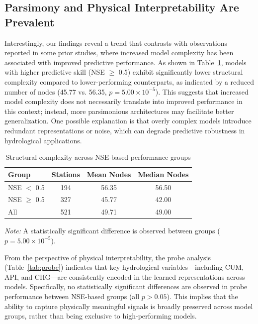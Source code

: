 \subsection{Parsimony and Physical Interpretability Are Prevalent}
Interestingly, our findings reveal a trend that contrasts with observations reported in some prior studies\cite{DONG2024130941,ZHOU2024132235}, where increased model complexity has been associated with improved predictive performance. As shown in Table~\ref{tab:complexity}, models with higher predictive skill (NSE $\geq$ 0.5) exhibit significantly lower structural complexity compared to lower-performing counterparts, as indicated by a reduced number of nodes (45.77 vs. 56.35, $p = 5.00 \times 10^{-5}$). This suggests that increased model complexity does not necessarily translate into improved performance in this context; instead, more parsimonious architectures may facilitate better generalization\cite{ORTH2015147}. One possible explanation is that overly complex models introduce redundant representations or noise, which can degrade predictive robustness in hydrological applications\cite{Wrr_PGDL}.

\begin{table}[htbp]
    \centering
    \caption{Structural complexity across NSE-based performance groups}
    \begin{tabular*}{\textwidth}{@{\extracolsep{\fill}}lccc}
        \toprule
        Group & Stations & Mean Nodes & Median Nodes \\
        \midrule
        NSE $<$ 0.5    & 194 & 56.35 & 56.50 \\
        NSE $\geq$ 0.5 & 327 & 45.77 & 42.00 \\
        All            & 521 & 49.71 & 49.00 \\
        \bottomrule
    \end{tabular*}

    \vspace{3pt}
    \begin{minipage}{\textwidth}
        \footnotesize
        \textit{Note:} A statistically significant difference is observed between groups ($p = 5.00 \times 10^{-5}$).
    \end{minipage}
    \label{tab:complexity}
\end{table}

From the perspective of physical interpretability, the probe analysis (Table~\ref{tab:probe}) indicates that key hydrological variables—including CUM, API, and CHG—are consistently encoded in the learned representations across models\cite{pmlr-v97-verma19a}. Specifically, no statistically significant differences are observed in probe performance between NSE-based groups (all $p > 0.05$). This implies that the ability to capture physically meaningful signals is broadly preserved across model groups\cite{e24050687_Shap_problem}, rather than being exclusive to high-performing models.


